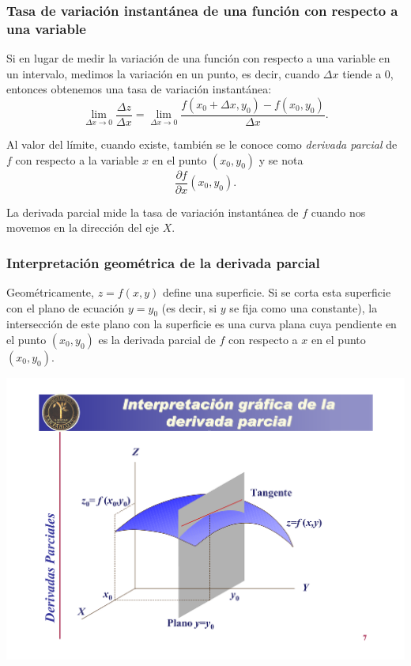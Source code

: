 \begin{frame}
\frametitle{Tasa de variación instantánea de una función con respecto a una variable}
Si en lugar de medir la variación de una función con respecto a una variable en un intervalo, medimos la variación en un punto, es decir, cuando $\Delta x$ tiende a 0, entonces obtenemos una tasa de variación instantánea:
\[\lim_{\Delta x\rightarrow 0}\frac{\Delta z}{\Delta x}=\lim_{\Delta x \rightarrow 0}\frac{f(x_0+\Delta x,y_0)-f(x_0,y_0)}{\Delta x}.\]

Al valor del límite, cuando existe, también se le conoce como \emph{derivada parcial} de $f$ con respecto a la variable $x$ en el punto $(x_0,y_0)$ y se nota
\[
\frac{\partial f}{\partial x}(x_0,y_0).
\]

La derivada parcial mide la tasa de variación instantánea de $f$ cuando nos movemos en la dirección del eje $X$.
\end{frame}


\begin{frame}
\frametitle{Interpretación geométrica de la derivada parcial}
Geométricamente, $z=f(x,y)$ define una superficie. Si se corta esta superficie con el plano de ecuación $y=y_0$ (es decir, si $y$ se fija como una constante), la intersección de este plano con la superficie es una curva plana cuya pendiente en el punto $(x_0,y_0)$ es la derivada parcial de $f$ con respecto a $x$ en el punto $(x_0,y_0)$.

\begin{center}
\includegraphics[scale=0.4]{img/tangentesuperficie}
\end{center}
\end{frame}


